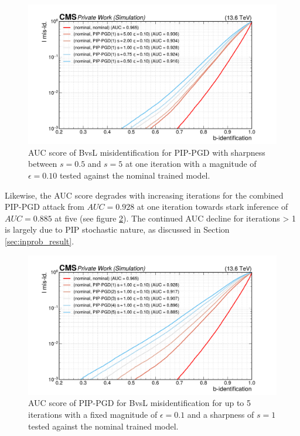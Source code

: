 \begin{figure}[h]
\centering
    \includegraphics[width=15cm]{media/output/roc_bvsl_combined_sharpness.pdf}
    \caption{AUC score of BvsL misidentification for PIP-PGD with sharpness between $s=0.5$ and $s=5$ at one iteration with a magnitude of $\epsilon=0.10$ tested against the nominal trained model.}
    \label{fig:combined_testing_sharpness}
\end{figure}

Likewise, the AUC score degrades with increasing iterations for the combined PIP-PGD attack from $AUC=0.928$ at one iteration towards stark inference of $AUC=0.885$ at five (see figure \ref{fig:combined_testing_iterations}). The continued AUC decline for iterations > 1 is largely due to PIP stochastic nature, as discussed in Section \ref{sec:inprob_result}.

\begin{figure}[h]
\centering
    \includegraphics[width=15cm]{media/output/roc_bvsl_combined_iterations.pdf}
    \caption{AUC score of PIP-PGD for BvsL misidentification for up to 5 iterations with a fixed magnitude of $\epsilon=0.1$ and a sharpness of $s=1$ tested against the nominal trained model.}
    \label{fig:combined_testing_iterations}
\end{figure}


